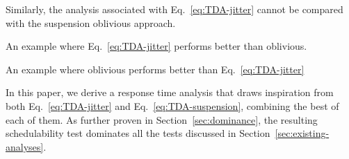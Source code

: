 Similarly, the analysis associated with Eq.~\eqref{eq:TDA-jitter} cannot be compared with the suspension oblivious approach.

\begin{example}  
An example where Eq.~\eqref{eq:TDA-jitter} performs better than oblivious. 
\end{example}

\begin{example}   
An example where oblivious performs better than Eq.~\eqref{eq:TDA-jitter} 
\end{example}

In this paper, we derive a response time analysis that draws inspiration from both Eq.~\eqref{eq:TDA-jitter} and Eq.~\eqref{eq:TDA-suspension}, combining the best of each of them. As further proven in Section~\ref{sec:dominance}, the resulting schedulability test dominates all the tests discussed in Section~\ref{sec:existing-analyses}.

